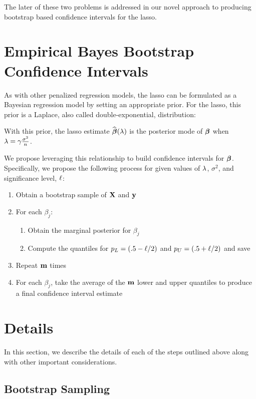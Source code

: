The later of these two problems is addressed in our novel approach to producing bootstrap based confidence intervals for the lasso.

\section{Empirical Bayes Bootstrap Confidence Intervals}

As with other penalized regression models, the lasso can be formulated as a Bayesian regression model by setting an appropriate prior. For the lasso, this prior is a Laplace, also called double-exponential, distribution:


With this prior, the lasso estimate $\widehat{\boldsymbol{\beta}}(\lambda)$ is the posterior mode of $\boldsymbol{\beta}$ when $\lambda = \gamma \frac{\sigma^2}{n}$.

We propose leveraging this relationship to build confidence intervals for $\boldsymbol{\beta}$. Specifically, we propose the following process for given values of $\lambda$, $\sigma^2$, and significance level, $\ell$:

\begin{enumerate}
\item Obtain a bootstrap sample of $\mathbf{X}$ and $\mathbf{y}$
\item For each $\beta_j$:
	\begin{enumerate}
	\item Obtain the marginal posterior for $\beta_j$
	\item Compute the quantiles for $p_{L} = (.5 - \ell/2)$ and $p_{U} = (.5 + \ell/2)$ and save
	\end{enumerate}
\item Repeat $\mathbf{m}$ times
\item For each $\beta_j$, take the average of the $\mathbf{m}$ lower and upper quantiles to produce a final confidence interval estimate
\end{enumerate}

\section{Details}

In this section, we describe the details of each of the steps outlined above along with other important considerations.

\subsection{Bootstrap Sampling}

